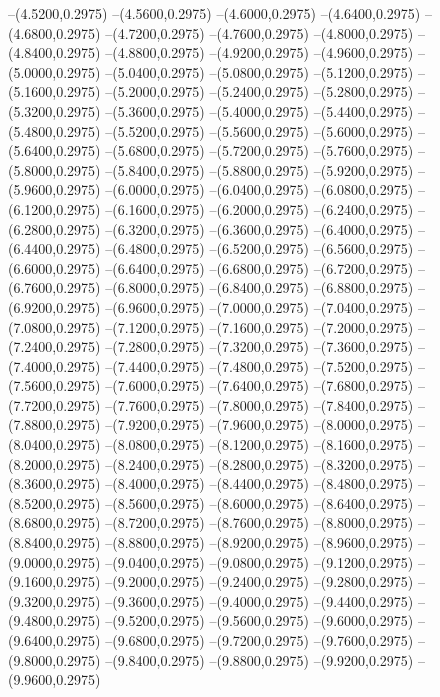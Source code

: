 {	--(4.5200,0.2975)
	--(4.5600,0.2975)
	--(4.6000,0.2975)
	--(4.6400,0.2975)
	--(4.6800,0.2975)
	--(4.7200,0.2975)
	--(4.7600,0.2975)
	--(4.8000,0.2975)
	--(4.8400,0.2975)
	--(4.8800,0.2975)
	--(4.9200,0.2975)
	--(4.9600,0.2975)
	--(5.0000,0.2975)
	--(5.0400,0.2975)
	--(5.0800,0.2975)
	--(5.1200,0.2975)
	--(5.1600,0.2975)
	--(5.2000,0.2975)
	--(5.2400,0.2975)
	--(5.2800,0.2975)
	--(5.3200,0.2975)
	--(5.3600,0.2975)
	--(5.4000,0.2975)
	--(5.4400,0.2975)
	--(5.4800,0.2975)
	--(5.5200,0.2975)
	--(5.5600,0.2975)
	--(5.6000,0.2975)
	--(5.6400,0.2975)
	--(5.6800,0.2975)
	--(5.7200,0.2975)
	--(5.7600,0.2975)
	--(5.8000,0.2975)
	--(5.8400,0.2975)
	--(5.8800,0.2975)
	--(5.9200,0.2975)
	--(5.9600,0.2975)
	--(6.0000,0.2975)
	--(6.0400,0.2975)
	--(6.0800,0.2975)
	--(6.1200,0.2975)
	--(6.1600,0.2975)
	--(6.2000,0.2975)
	--(6.2400,0.2975)
	--(6.2800,0.2975)
	--(6.3200,0.2975)
	--(6.3600,0.2975)
	--(6.4000,0.2975)
	--(6.4400,0.2975)
	--(6.4800,0.2975)
	--(6.5200,0.2975)
	--(6.5600,0.2975)
	--(6.6000,0.2975)
	--(6.6400,0.2975)
	--(6.6800,0.2975)
	--(6.7200,0.2975)
	--(6.7600,0.2975)
	--(6.8000,0.2975)
	--(6.8400,0.2975)
	--(6.8800,0.2975)
	--(6.9200,0.2975)
	--(6.9600,0.2975)
	--(7.0000,0.2975)
	--(7.0400,0.2975)
	--(7.0800,0.2975)
	--(7.1200,0.2975)
	--(7.1600,0.2975)
	--(7.2000,0.2975)
	--(7.2400,0.2975)
	--(7.2800,0.2975)
	--(7.3200,0.2975)
	--(7.3600,0.2975)
	--(7.4000,0.2975)
	--(7.4400,0.2975)
	--(7.4800,0.2975)
	--(7.5200,0.2975)
	--(7.5600,0.2975)
	--(7.6000,0.2975)
	--(7.6400,0.2975)
	--(7.6800,0.2975)
	--(7.7200,0.2975)
	--(7.7600,0.2975)
	--(7.8000,0.2975)
	--(7.8400,0.2975)
	--(7.8800,0.2975)
	--(7.9200,0.2975)
	--(7.9600,0.2975)
	--(8.0000,0.2975)
	--(8.0400,0.2975)
	--(8.0800,0.2975)
	--(8.1200,0.2975)
	--(8.1600,0.2975)
	--(8.2000,0.2975)
	--(8.2400,0.2975)
	--(8.2800,0.2975)
	--(8.3200,0.2975)
	--(8.3600,0.2975)
	--(8.4000,0.2975)
	--(8.4400,0.2975)
	--(8.4800,0.2975)
	--(8.5200,0.2975)
	--(8.5600,0.2975)
	--(8.6000,0.2975)
	--(8.6400,0.2975)
	--(8.6800,0.2975)
	--(8.7200,0.2975)
	--(8.7600,0.2975)
	--(8.8000,0.2975)
	--(8.8400,0.2975)
	--(8.8800,0.2975)
	--(8.9200,0.2975)
	--(8.9600,0.2975)
	--(9.0000,0.2975)
	--(9.0400,0.2975)
	--(9.0800,0.2975)
	--(9.1200,0.2975)
	--(9.1600,0.2975)
	--(9.2000,0.2975)
	--(9.2400,0.2975)
	--(9.2800,0.2975)
	--(9.3200,0.2975)
	--(9.3600,0.2975)
	--(9.4000,0.2975)
	--(9.4400,0.2975)
	--(9.4800,0.2975)
	--(9.5200,0.2975)
	--(9.5600,0.2975)
	--(9.6000,0.2975)
	--(9.6400,0.2975)
	--(9.6800,0.2975)
	--(9.7200,0.2975)
	--(9.7600,0.2975)
	--(9.8000,0.2975)
	--(9.8400,0.2975)
	--(9.8800,0.2975)
	--(9.9200,0.2975)
	--(9.9600,0.2975)
}
